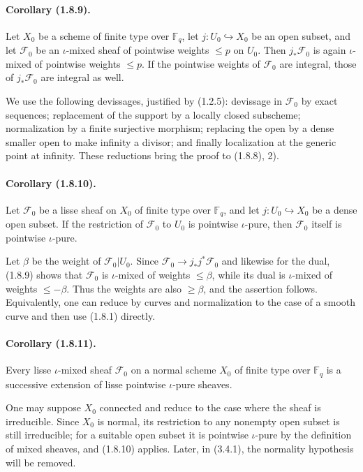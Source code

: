 \documentclass[11pt]{article}
\theoremstyle{remark}
\newcommand{\Fq}{\mathbb{F}_q}
\begin{document}
\paragraph{Corollary (1.8.9).}
Let $X_0$ be a scheme of finite type over $\Fq$, let $j:U_0\hookrightarrow X_0$ be an open subset, and let $\mathcal F_0$ be an $\iota$-mixed sheaf of pointwise weights $\le p$ on $U_0$. Then $j_*\mathcal F_0$ is again $\iota$-mixed of pointwise weights $\le p$. If the pointwise weights of $\mathcal F_0$ are integral, those of $j_*\mathcal F_0$ are integral as well.

We use the following devissages, justified by (1.2.5): devissage in $\mathcal F_0$ by exact sequences; replacement of the support by a locally closed subscheme; normalization by a finite surjective morphism; replacing the open by a dense smaller open to make infinity a divisor; and finally localization at the generic point at infinity. These reductions bring the proof to (1.8.8), 2).

\paragraph{Corollary (1.8.10).}
Let $\mathcal F_0$ be a lisse sheaf on $X_0$ of finite type over $\Fq$, and let $j:U_0\hookrightarrow X_0$ be a dense open subset. If the restriction of $\mathcal F_0$ to $U_0$ is pointwise $\iota$-pure, then $\mathcal F_0$ itself is pointwise $\iota$-pure.

Let $\beta$ be the weight of $\mathcal F_0|U_0$. Since $\mathcal F_0\to j_*j^*\mathcal F_0$ and likewise for the dual, (1.8.9) shows that $\mathcal F_0$ is $\iota$-mixed of weights $\le\beta$, while its dual is $\iota$-mixed of weights $\le -\beta$. Thus the weights are also $\ge\beta$, and the assertion follows. Equivalently, one can reduce by curves and normalization to the case of a smooth curve and then use (1.8.1) directly.

\paragraph{Corollary (1.8.11).}
Every lisse $\iota$-mixed sheaf $\mathcal F_0$ on a normal scheme $X_0$ of finite type over $\Fq$ is a successive extension of lisse pointwise $\iota$-pure sheaves.

One may suppose $X_0$ connected and reduce to the case where the sheaf is irreducible. Since $X_0$ is normal, its restriction to any nonempty open subset is still irreducible; for a suitable open subset it is pointwise $\iota$-pure by the definition of mixed sheaves, and (1.8.10) applies. Later, in (3.4.1), the normality hypothesis will be removed.
\end{document}

